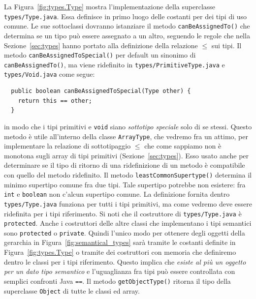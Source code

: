 La Figura~\ref{fig:types.Type} mostra l'implementazione della superclasse
\texttt{types/Type.java}. Essa definisce in primo luogo delle costanti
per dei tipi di uso comune. Le sue sottoclassi dovranno istanziare
il metodo \texttt{canBeAssignedTo()} che determina
se un tipo pu\`o essere assegnato a un
altro, seguendo le regole che nella Sezione~\ref{sec:types}
hanno portato alla definizione della relazione $\le$ sui tipi. Il metodo
\texttt{canBeAssignedToSpecial()} \e per default un sinonimo di
\texttt{canBeAssignedTo()}, ma viene ridefinito in
\texttt{types/PrimitiveType.java} e \texttt{types/Void.java} come segue:
%
\begin{verbatim}
  public boolean canBeAssignedToSpecial(Type other) {
    return this == other;
  }
\end{verbatim}
%
in modo che i tipi primitivi e \texttt{void} siano
\emph{sottotipo speciale} solo di se stessi. Questo metodo \`e
utile all'interno della classe \texttt{ArrayType}, che vedremo fra un attimo,
per implementare la relazione di sottotipaggio $\le$ che come sappiamo
non \`e monotona sugli array di tipi primitivi (Sezione~\ref{sec:types}).
Esso \e usato anche per determinare se il tipo di ritorno di una ridefinizione
di un metodo \`e compatibile con quello del metodo ridefinito.
Il metodo \texttt{leastCommonSupertype()} determina il minimo supertipo comune
fra due tipi. Tale supertipo potrebbe non esistere: fra
\texttt{int} e \texttt{boolean} non c'\e alcun supertipo comune.
La definizione fornita dentro
\texttt{types/Type.java} funziona per tutti i tipi primitivi, ma come
vedremo deve essere ridefinita per i tipi riferimento.
Si noti che il costruttore di \texttt{types/Type.java} \`e \texttt{protected}.
Anche i costruttori delle altre classi che implementano i tipi semantici sono
\texttt{protected} o \texttt{private}. Quindi
l'unico modo per ottenere degli oggetti della
gerarchia in Figura~\ref{fig:semantical_types} sar\`a tramite le costanti
definite in Figura~\ref{fig:types.Type} o tramite
dei costruttori con memoria che
definiremo dentro le classi per i tipi riferimento. Questo implica
che \emph{esiste al pi\`u un oggetto per un dato tipo semantico}
e l'uguaglianza fra tipi pu\`o essere controllata con
semplici confronti Java \texttt{==}. Il metodo \texttt{getObjectType()}
ritorna il tipo della superclasse \texttt{Object} di tutte le classi ed array.

